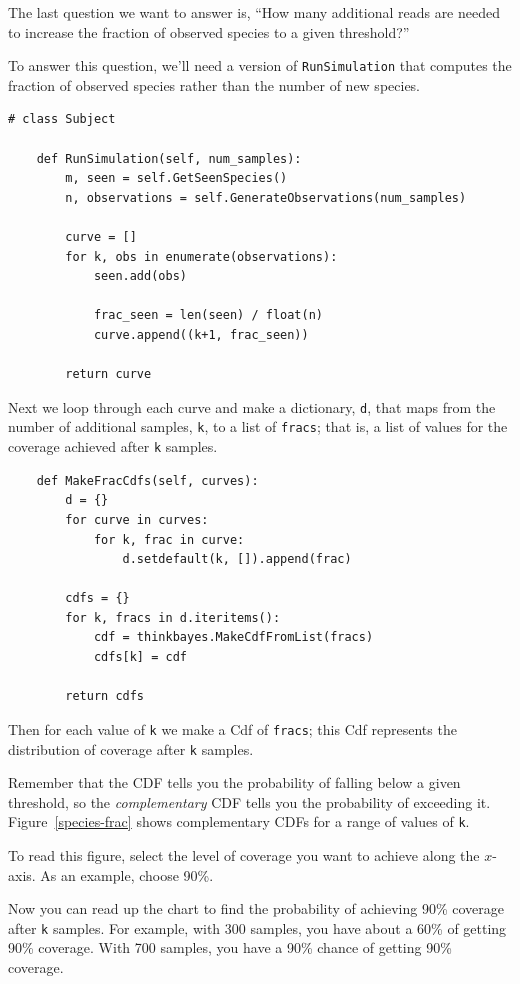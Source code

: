 \documentclass[12pt]{book}
\begin{document}
The last question we want to answer is, ``How many additional reads
are needed to increase the fraction of observed species to a given
threshold?''

To answer this question, we'll need a version of {\tt RunSimulation}
that computes the fraction of observed species rather than the
number of new species.

\begin{verbatim}
# class Subject

    def RunSimulation(self, num_samples):
        m, seen = self.GetSeenSpecies()
        n, observations = self.GenerateObservations(num_samples)

        curve = []
        for k, obs in enumerate(observations):
            seen.add(obs)

            frac_seen = len(seen) / float(n)
            curve.append((k+1, frac_seen))

        return curve
\end{verbatim}

Next we loop through each curve and make a dictionary, {\tt d},
that maps from the number of additional samples, {\tt k}, to
a list of {\tt fracs}; that is, a list of values for the
coverage achieved after {\tt k} samples.

\begin{verbatim}
    def MakeFracCdfs(self, curves):
        d = {}
        for curve in curves:
            for k, frac in curve:
                d.setdefault(k, []).append(frac)

        cdfs = {}
        for k, fracs in d.iteritems():
            cdf = thinkbayes.MakeCdfFromList(fracs)
            cdfs[k] = cdf

        return cdfs
\end{verbatim}

Then for each value of {\tt k} we make a Cdf of {\tt fracs};
this Cdf represents the distribution of coverage after
{\tt k} samples.

Remember that the CDF tells you the probability of falling
below a given threshold, so the {\em complementary} CDF tells
you the probability of exceeding it.  Figure~\ref{species-frac}
shows complementary CDFs for a range of values of {\tt k}.

To read this figure, select the level of coverage you want
to achieve along the $x$-axis.  As an example, choose 90\%.

Now you can read up the chart to find the probability of
achieving 90\% coverage after {\tt k} samples.  For example,
with 300 samples, you have about a 60\% of getting 90\%
coverage.  With 700 samples, you have a 90\% chance of
getting 90\% coverage.
\end{document}
